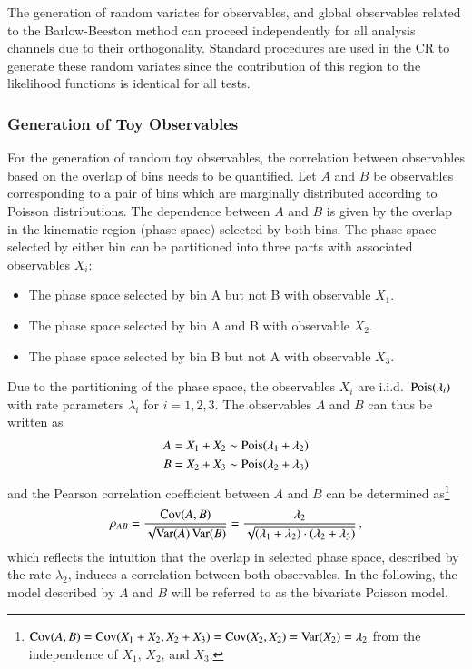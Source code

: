 The generation of random variates for observables, and global observables
related to the Barlow-Beeston method can proceed independently for all analysis
channels due to their orthogonality. Standard procedures are used in the CR to
generate these random variates since the contribution of this region to the
likelihood functions is identical for all tests.


\subsubsection{Generation of Toy Observables}

For the generation of random toy observables, the correlation between
observables based on the overlap of bins needs to be quantified. Let $A$ and $B$
be observables corresponding to a pair of bins which are marginally distributed
according to Poisson distributions. The dependence between $A$ and $B$ is given
by the overlap in the kinematic region (phase space) selected by both bins. The
phase space selected by either bin can be partitioned into three parts with
associated observables $X_i$:
\begin{itemize}
\item The phase space selected by bin A but not B with observable $X_1$.
\item The phase space selected by bin A and B with observable $X_2$.
\item The phase space selected by bin B but not A with observable $X_3$.
\end{itemize}
Due to the partitioning of the phase space, the observables $X_i$ are i.i.d.\
$\operatorname{Pois}(\lambda_i)$ with rate parameters $\lambda_i$ for $i = 1, 2, 3$. The
observables $A$ and $B$ can thus be written as
\begin{align*}
  A &= X_1 + X_2 \sim \operatorname{Pois}(\lambda_1 + \lambda_2) \\
  B &= X_2 + X_3 \sim \operatorname{Pois}(\lambda_2 + \lambda_3)
\end{align*}
and the Pearson correlation coefficient between $A$ and $B$ can be determined
as\footnote{$\operatorname{Cov}(A,B) = \operatorname{Cov}(X_1 + X_2, X_2 + X_3) = \operatorname{Cov}(X_2, X_2) = \operatorname{Var}(X_2)
  = \lambda_2$ from the independence of $X_1$, $X_2$, and $X_3$.}
\begin{align*}
  \rho_{AB} = \frac{\operatorname{Cov}(A, B)}{\sqrt{\operatorname{Var}(A)\operatorname{Var}(B)}}
  = \frac{\lambda_2}{\sqrt{(\lambda_1 + \lambda_2) \cdot (\lambda_2 + \lambda_3)}} \,\text{,}
\end{align*}
which reflects the intuition that the overlap in selected phase space, described
by the rate $\lambda_2$, induces a correlation between both observables. In the
following, the model described by $A$ and $B$ will be referred to as the
bivariate Poisson model.

